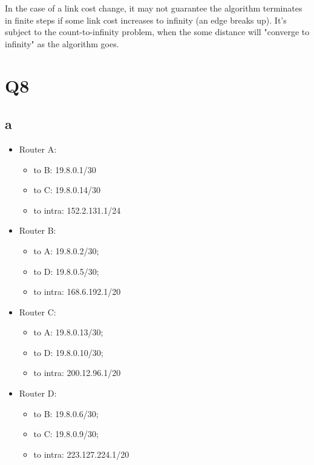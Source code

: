 \documentclass[a4paper, 11pt]{article}
\begin{document}
	In the case of a link cost change, it may not guarantee the algorithm
	terminates in finite steps if some link cost increases to infinity (an edge
	breaks up). It's subject to the count-to-infinity problem, when the some
	distance will "converge to infinity" as the algorithm goes. 
	
\section{Q8}
\subsection{a}
	\begin{multicols}{2}
	
	\begin{itemize}
	\item Router A: 
		\begin{itemize}
		  \item to B: 19.8.0.1/30
		  \item to C: 19.8.0.14/30
		  \item to intra: 152.2.131.1/24
		\end{itemize}
	\item Router B: 
		\begin{itemize}
		  \item to A: 19.8.0.2/30; 
		  \item to D: 19.8.0.5/30; 
		  \item to intra: 168.6.192.1/20
		\end{itemize}
	\item Router C: 
		\begin{itemize}
		  \item to A: 19.8.0.13/30; 
		  \item to D: 19.8.0.10/30; 
		  \item to intra: 200.12.96.1/20
		\end{itemize}
	\item Router D: 
		\begin{itemize}
		  \item to B: 19.8.0.6/30; 
		  \item to C: 19.8.0.9/30; 
		  \item to intra: 223.127.224.1/20
		\end{itemize}
	\end{itemize}
	

\end{multicols}
\end{document}
